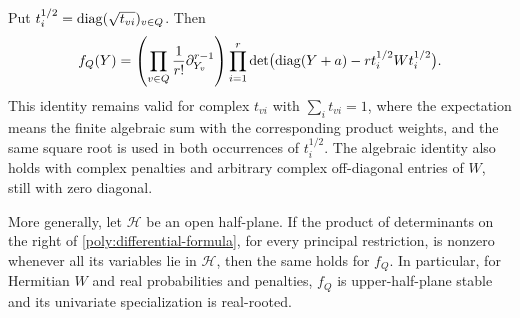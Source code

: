 \begin{lemma}[Stability]\label{lem:stability}
Put $t_i^{1/2}=\operatorname{diag}(\sqrt{t_{vi}})_{v\in Q}$. Then
\begin{equation}\label{poly:differential-formula}
 f_Q(Y)=
 \left(\prod_{v\in Q}\frac{1}{r!}\partial_{Y_v}^{r-1}\right)
 \prod_{i=1}^r
 \det\bigl(\operatorname{diag}(Y+a)-r t_i^{1/2}Wt_i^{1/2}\bigr).
\end{equation}
This identity remains valid for complex $t_{vi}$ with $\sum_i t_{vi}=1$,
where the expectation means the finite algebraic sum with the corresponding
product weights, and the same square root is used in both occurrences of
$t_i^{1/2}$. The algebraic identity also holds with complex penalties
and arbitrary complex off-diagonal entries of $W$, still with zero diagonal.

More generally, let $\mathcal H$ be an open half-plane. If the product of
determinants on the right of \eqref{poly:differential-formula}, for every
principal restriction, is nonzero whenever all its variables lie in
$\mathcal H$, then the same holds for $f_Q$. In particular, for Hermitian
$W$ and real probabilities and penalties, $f_Q$ is upper-half-plane stable and
its univariate specialization is real-rooted.
\end{lemma}

